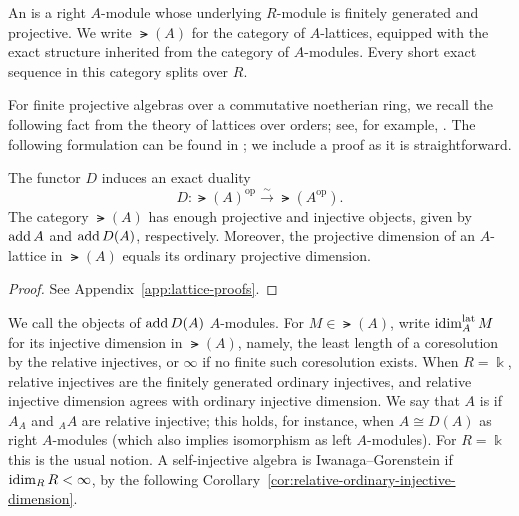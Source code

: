 \documentclass[a4paper,leqno]{amsart}
\begin{document}
An  is a right $A$-module whose underlying $R$-module is finitely generated and projective. We write $\lat(A)$ for the category of $A$-lattices, equipped with the exact structure inherited from the category of $A$-modules. Every short exact sequence in this category splits over $R$.

For finite projective algebras over a commutative noetherian ring, we recall the following fact from the theory of lattices over orders; see, for example, \cite[Section~25]{CR81}.
The following formulation can be found in \cite[Section~2]{BBIKP25}; we include a proof as it is straightforward.

\begin{lem}\label{lem:lattice-canonical-duality}
The functor $D$ induces an exact duality
\[
 D:\lat(A)^{\operatorname{op}}
 \xrightarrow{\sim}\lat(A^{\operatorname{op}}).
\]
The category $\lat(A)$ has enough projective and injective objects, given by $\operatorname{add} A$ and $\operatorname{add} D(A)$, respectively. Moreover, the projective dimension of an $A$-lattice in $\lat(A)$ equals its ordinary projective dimension.
\end{lem}

\begin{proof}
See Appendix~\ref{app:lattice-proofs}.
\end{proof}

We call the objects of $\operatorname{add} D(A)$  $A$-modules. For $M\in\lat(A)$, write $\operatorname{idim}^{\operatorname{lat}}_A M$ for its  injective dimension in $\lat(A)$, namely, the least length of a coresolution by the relative injectives, or $\infty$ if no finite such coresolution exists. When $R=\Bbbk$, relative injectives are the finitely generated ordinary injectives, and relative injective dimension agrees with ordinary injective dimension.
We say that $A$ is  if $A_A$ and ${}_AA$ are relative injective; this holds, for instance, when $A\cong D(A)$ as right $A$-modules (which also implies isomorphism as left $A$-modules). For $R=\Bbbk$ this is the usual notion.  A self-injective algebra is Iwanaga--Gorenstein if $\operatorname{idim}_RR<\infty$, by the following Corollary~\ref{cor:relative-ordinary-injective-dimension}.
\end{document}
